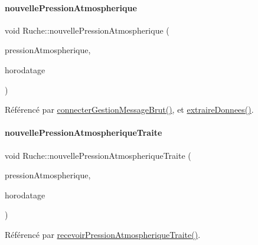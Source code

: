 \mbox{\label{class_ruche_ae72c86953df530bc5d3901ba66cf884d}} 
\paragraph{\texorpdfstring{nouvelle\+Pression\+Atmospherique}{nouvellePressionAtmospherique}}
{\footnotesize\ttfamily void Ruche\+::nouvelle\+Pression\+Atmospherique (\begin{DoxyParamCaption}\item[{Q\+String}]{pression\+Atmospherique,  }\item[{Q\+String}]{horodatage }\end{DoxyParamCaption})\hspace{0.3cm}{\ttfamily [signal]}}



Référencé par \hyperlink{class_ruche_a9c8e7e3b529676c6dda3d936370af00f}{connecter\+Gestion\+Message\+Brut()}, et \hyperlink{class_ruche_a21c0dafeaec03d451590037343e6a3ca}{extraire\+Donnees()}.

\mbox{\label{class_ruche_ac55a1301b55166474b700ee0a2a57f22}} 
\paragraph{\texorpdfstring{nouvelle\+Pression\+Atmospherique\+Traite}{nouvellePressionAtmospheriqueTraite}}
{\footnotesize\ttfamily void Ruche\+::nouvelle\+Pression\+Atmospherique\+Traite (\begin{DoxyParamCaption}\item[{double}]{pression\+Atmospherique,  }\item[{Q\+String}]{horodatage }\end{DoxyParamCaption})\hspace{0.3cm}{\ttfamily [signal]}}



Référencé par \hyperlink{class_ruche_a3b43ce547e616ee0b14e3a0e0aa44a4d}{recevoir\+Pression\+Atmospherique\+Traite()}.

\mbox{\label{class_ruche_aa8d28f554cd485c32d348a9147d2e236}} 
